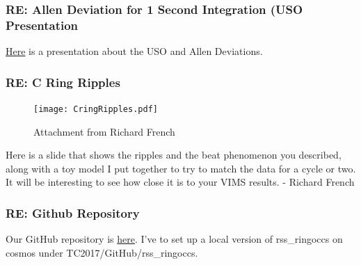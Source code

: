 \documentclass[crop=false,class=book]{standalone}
\begin{document}
\subsubsection{\footnotesize RE: Allen Deviation for 1 Second Integration (USO Presentation}
\href{https://websites.isae-supaero.fr/IMG/pdf/uso-toulouse.pdf}{Here} is a presentation about the USO and Allen Deviations.
\subsubsection{\footnotesize RE: C Ring Ripples}
\begin{figure}
    \centering
    \texttt{[image: CringRipples.pdf]}
    \caption{Attachment from Richard French}
\end{figure}
Here is a slide that shows the ripples and the beat phenomenon you described, along with a toy model I put together to try to match the data for a cycle or two. It will be interesting to see how close it is to your VIMS results. - Richard French
\subsubsection{\footnotesize RE: Github Repository}
Our GitHub repository is \href{https://github.com/NASA-Planetary-Science/rss_ringoccs}{here}. I've to set up a local version of rss\_ringoccs on cosmos under TC2017/GitHub/rss\_ringoccs.
\end{document}
